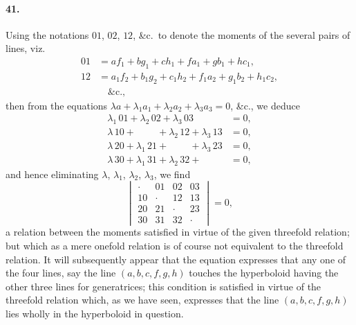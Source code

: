 \documentclass[11pt,a4paper]{article}
\begin{document}
\paragraph{41.}
Using the notations $01$, $02$, $12$, \&c.\ to denote the moments of the several
pairs of lines, viz.
\begin{align*}
01 &= a f_1 + b g_1 + c h_1 + f a_1 + g b_1 + h c_1, \\
12 &= a_1 f_2 + b_1 g_2 + c_1 h_2 + f_1 a_2 + g_1 b_2 + h_1 c_2, \\
&\quad\&\text{c.,}
\end{align*}
then from the equations $\lambda a + \lambda_1 a_1 + \lambda_2 a_2 + \lambda_3 a_3 = 0$, \&c., we deduce
\begin{align*}
\lambda_1\,01 + \lambda_2\,02 + \lambda_3\,03 &= 0, \\
\lambda\,10 + {}\phantom{\lambda_1\,11} + \lambda_2\,12 + \lambda_3\,13 &= 0, \\
\lambda\,20 + \lambda_1\,21 + {}\phantom{\lambda_2\,22} + \lambda_3\,23 &= 0, \\
\lambda\,30 + \lambda_1\,31 + \lambda_2\,32 + {}\phantom{\lambda_3\,33} &= 0,
\end{align*}
and hence eliminating $\lambda$, $\lambda_1$, $\lambda_2$, $\lambda_3$, we find
\[
\begin{vmatrix}
\cdot & 01 & 02 & 03 \\
10 & \cdot & 12 & 13 \\
20 & 21 & \cdot & 23 \\
30 & 31 & 32 & \cdot
\end{vmatrix} = 0,
\]
a relation between the moments satisfied in virtue of the given threefold relation; but
which as a mere onefold relation is of course not equivalent to the threefold relation.
It will subsequently appear that the equation expresses that any one of the four lines,
say the line $(a,b,c,f,g,h)$ touches the hyperboloid having the other three lines for
generatrices; this condition is satisfied in virtue of the threefold relation which, as we
have seen, expresses that the line $(a,b,c,f,g,h)$ lies wholly in the hyperboloid in
question.
\end{document}
